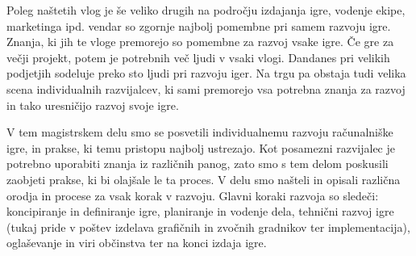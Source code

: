 \documentclass[12pt,a4paper,twoside]{book}
\begin{document}
Poleg naštetih vlog je še veliko drugih na področju izdajanja igre, vodenje ekipe, marketinga ipd. vendar so zgornje najbolj pomembne pri samem razvoju igre. Znanja, ki jih te vloge premorejo so pomembne za razvoj vsake igre. Če gre za večji projekt, potem je potrebnih več ljudi v vsaki vlogi. Dandanes pri velikih podjetjih sodeluje preko sto ljudi pri razvoju iger. Na trgu pa obstaja tudi velika scena individualnih razvijalcev, ki sami premorejo vsa potrebna znanja za razvoj in tako uresničijo razvoj svoje igre. 

V tem magistrskem delu smo se posvetili individualnemu razvoju računalniške igre, in prakse, ki temu pristopu najbolj ustrezajo. Kot posamezni razvijalec je potrebno uporabiti znanja iz različnih panog, zato smo s tem delom poskusili zaobjeti prakse, ki bi olajšale le ta proces. V delu smo našteli in opisali različna orodja in procese za vsak korak v razvoju. Glavni koraki razvoja so sledeči: koncipiranje in definiranje igre, planiranje in vodenje dela, tehnični razvoj igre (tukaj pride v poštev izdelava grafičnih in zvočnih gradnikov ter implementacija), oglaševanje in viri občinstva ter na konci izdaja igre.
\end{document}
